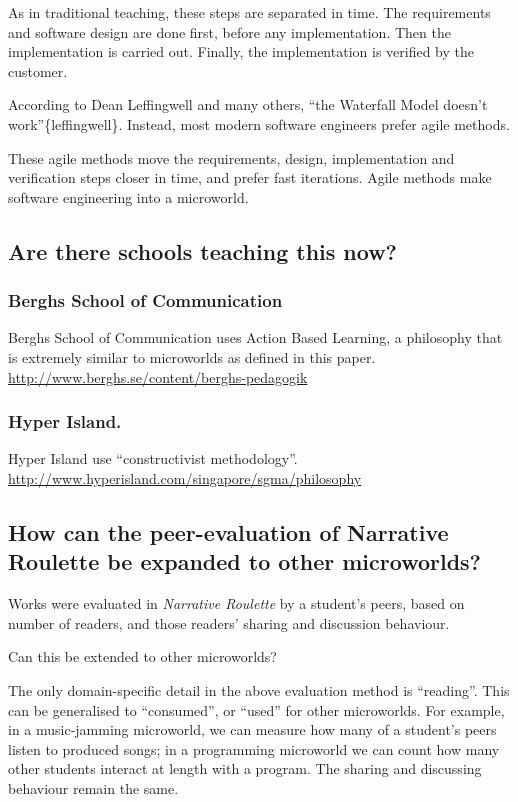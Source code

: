 As in traditional teaching, these steps are separated in time. The
requirements and software design are done first, before any
implementation. Then the implementation is carried out. Finally, the
implementation is verified by the customer.

According to Dean Leffingwell and many others, ``the Waterfall Model
doesn't work''\{leffingwell\}. Instead, most modern software engineers
prefer agile methods.

These agile methods move the requirements, design, implementation and
verification steps closer in time, and prefer fast iterations. Agile
methods make software engineering into a microworld.

\subsection{Are there schools teaching this now?}

\subsubsection{Berghs School of Communication}

Berghs School of Communication uses Action Based Learning, a philosophy
that is extremely similar to microworlds as defined in this paper.
\href{http://www.berghs.se/content/berghs-pedagogik}{http://www.berghs.se/content/berghs-pedagogik}

\subsubsection{Hyper Island.}

Hyper Island use ``constructivist methodology''.
\href{http://www.hyperisland.com/singapore/sgma/philosophy}{http://www.hyperisland.com/singapore/sgma/philosophy}

\subsection{How can the peer-evaluation of Narrative Roulette be
expanded to other microworlds?}

Works were evaluated in \emph{Narrative Roulette} by a student's peers,
based on number of readers, and those readers' sharing and discussion
behaviour.

Can this be extended to other microworlds?

The only domain-specific detail in the above evaluation method is
``reading''. This can be generalised to ``consumed'', or ``used'' for
other microworlds. For example, in a music-jamming microworld, we can
measure how many of a student's peers listen to produced songs; in a
programming microworld we can count how many other students interact at
length with a program. The sharing and discussing behaviour remain the
same.

